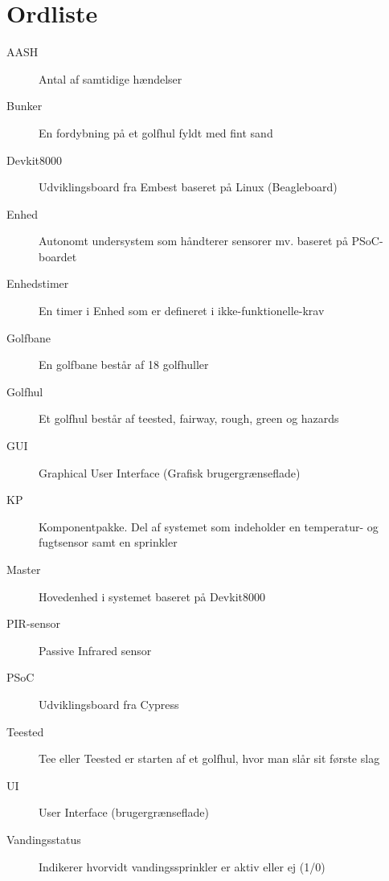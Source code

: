 \chapter{Ordliste}


\begin{description}

\item[AASH] Antal af samtidige hændelser
\item[Bunker] En fordybning på et golfhul fyldt med fint sand
\item[Devkit8000] Udviklingsboard fra Embest baseret på Linux (Beagleboard)
\item[Enhed] Autonomt undersystem som håndterer sensorer mv. baseret på PSoC-boardet
\item[Enhedstimer] En timer i Enhed som er defineret i ikke-funktionelle-krav
\item[Golfbane] En golfbane består af 18 golfhuller
\item[Golfhul] Et golfhul består af teested, fairway, rough, green og hazards
\item[GUI] Graphical User Interface (Grafisk brugergrænseflade)
\item[KP] Komponentpakke. Del af systemet som indeholder en temperatur- og fugtsensor samt en sprinkler
\item[Master] Hovedenhed i systemet baseret på Devkit8000
\item[PIR-sensor] Passive Infrared sensor
\item[PSoC] Udviklingsboard fra Cypress
\item[Teested] Tee eller Teested er starten af et golfhul, hvor man slår sit første slag
\item[UI] User Interface (brugergrænseflade)
\item[Vandingsstatus] Indikerer hvorvidt vandingssprinkler er aktiv eller ej (1/0)

\end{description}